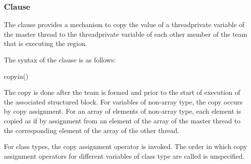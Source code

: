 \subsubsection{ Clause}
\label{subsubsec:copyin clause}
\summary
The  clause provides a mechanism to copy the value of a threadprivate 
variable of the master thread to the threadprivate variable of each other member of 
the team that is executing the  region.

\syntax
The syntax of the  clause is as follows:

\begin{ompSyntax}
copyin()
\end{ompSyntax}

\descr
\begin{ccppspecific}
The copy is done after the team is formed and prior to the start of execution of the
associated structured block. For variables of non-array type, the copy occurs by copy
assignment. For an array of elements of non-array type, each element is copied as if by
assignment from an element of the array of the master thread to the corresponding 
element of the array of the other thread.
\end{ccppspecific}

\begin{cppspecific}
For class types, the copy assignment operator is invoked. The order in which copy
assignment operators for different variables of class type are called is unspecified.
\end{cppspecific}

